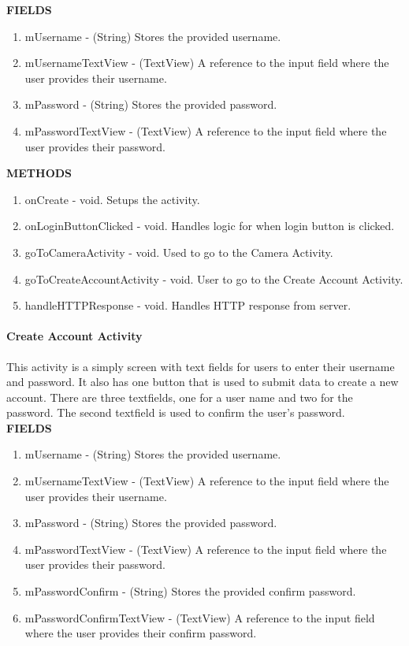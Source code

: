 \documentclass[11pt,a4paper,titlepage]{article}
\begin{document}
\textbf{FIELDS}
\begin{enumerate}
  \item mUsername - (String) Stores the provided username.
  \item mUsernameTextView - (TextView) A reference to the input field where the user provides their username.
  \item mPassword - (String) Stores the provided password.
  \item mPasswordTextView - (TextView) A reference to the input field where the user provides their password.
\end{enumerate}

\textbf{METHODS}
\begin{enumerate}
  \item onCreate - void. Setups the activity.
  \item onLoginButtonClicked - void. Handles logic for when login button is clicked.
  \item goToCameraActivity - void. Used to go to the Camera Activity.
  \item goToCreateAccountActivity - void. User to go to the Create Account Activity.
  \item handleHTTPResponse - void. Handles HTTP response from server.
\end{enumerate}

\paragraph{Create Account Activity\\}
This activity is a simply screen with text fields for users to enter their username and password. It also has one button that is used to submit data to create a new account. There are three textfields, one for a user name and two for the password. The second textfield is used to confirm the user's password.
\\

\textbf{FIELDS}
\begin{enumerate}
  \item mUsername - (String) Stores the provided username.
  \item mUsernameTextView - (TextView) A reference to the input field where the user provides their username.
  \item mPassword - (String) Stores the provided password.
  \item mPasswordTextView - (TextView) A reference to the input field where the user provides their password.
  \item mPasswordConfirm - (String) Stores the provided confirm password.
  \item mPasswordConfirmTextView - (TextView) A reference to the input field where the user provides their confirm password.
\end{enumerate}
\end{document}
